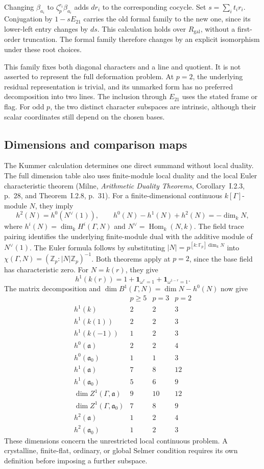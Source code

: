 Changing \(\beta_{a_i}\) to \(\zeta_p^{r_i}\beta_{a_i}\) adds
\(dr_i\) to the corresponding cocycle. Set \(s=\sum_i t_i r_i\).
Conjugation by \(1-sE_{21}\) carries the old formal family to the new
one, since its lower-left entry changes by \(ds\).
This calculation holds over \(R_{\mathrm{gal}}\), without a first-order truncation.
The formal family therefore changes by an explicit isomorphism under
these root choices.

This family fixes both diagonal characters and a line and quotient.
It is not asserted to represent the full deformation problem.
At \(p=2\), the underlying residual representation is trivial, and its
unmarked form has no preferred decomposition into two lines.
The inclusion through \(E_{21}\) uses the stated frame or flag.
For odd \(p\), the two distinct character subspaces are intrinsic,
although their scalar coordinates still depend on the chosen bases.

\subsection{Dimensions and comparison maps}

The Kummer calculation determines one direct summand without local
duality. The full dimension table also uses finite-module local duality
and the local Euler characteristic theorem
(Milne, \emph{Arithmetic Duality Theorems}, Corollary~I.2.3, p.~28, and Theorem~I.2.8, p.~31).
For a finite-dimensional continuous \(k[\Gamma]\)-module \(N\), they imply
\[
 h^2(N)=h^0(N^\vee(1)),\qquad
 h^0(N)-h^1(N)+h^2(N)=-\dim_kN,
\]
where \(h^i(N)=\dim_kH^i(\Gamma,N)\) and
\(N^\vee=\operatorname{Hom}_k(N,k)\).
The field trace pairing identifies the underlying finite-module dual
with the additive module of \(N^\vee(1)\).
The Euler formula follows by substituting
\(|N|=p^{[k:\mathbb F_p]\dim_kN}\) into
\(\chi(\Gamma,N)=(\mathbb Z_p:|N|\mathbb Z_p)^{-1}\).
Both theorems apply at \(p=2\), since the base field has characteristic zero.
For \(N=k(r)\), they give
\[
 h^1(k(r))=1+\mathbf1_{\omega^r=1}+\mathbf1_{\omega^{1-r}=1}.
\]
The matrix decomposition and
\(\dim B^1(\Gamma,N)=\dim N-h^0(N)\) now give
\[
\begin{array}{c|ccc}
 &p\ge5&p=3&p=2\\\hline
 h^1(k)&2&2&3\\
 h^1(k(1))&2&2&3\\
 h^1(k(-1))&1&2&3\\
 h^0(\mathfrak a)&2&2&4\\
 h^0(\mathfrak a_0)&1&1&3\\
 h^1(\mathfrak a)&7&8&12\\
 h^1(\mathfrak a_0)&5&6&9\\
 \dim Z^1(\Gamma,\mathfrak a)&9&10&12\\
 \dim Z^1(\Gamma,\mathfrak a_0)&7&8&9\\
 h^2(\mathfrak a)&1&2&4\\
 h^2(\mathfrak a_0)&1&2&3
\end{array}
\]
These dimensions concern the unrestricted local continuous problem.
A crystalline, finite-flat, ordinary, or global Selmer condition requires
its own definition before imposing a further subspace.

